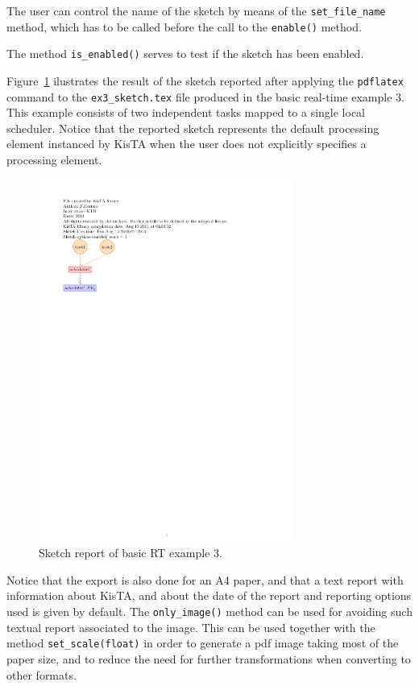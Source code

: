 The user can control the name of the sketch by means of the \texttt{set\_file\_name} method,
which has to be called before the call to the \texttt{enable()} method.

The method \texttt{is\_enabled()} serves to test if the sketch has been enabled.

Figure~\ref{fig:ex3_sketch} ilustrates the result of the sketch reported
after applying the \texttt{pdflatex} command to the \texttt{ex3\_sketch.tex} file
produced in the basic real-time example 3.
This example consists of two independent tasks mapped to a single local scheduler.
Notice that the reported sketch represents the default processing element
instanced by KisTA when the user does not explicitly specifies a processing element.
%

\begin{figure}[h]
\centering
\includegraphics[width=0.75\textwidth]{./figs/ex3_sketch.png} 
\caption{Sketch report of basic RT example 3.} 
\label{fig:ex3_sketch}
\end{figure}

Notice that the export is also done for an A4 paper, and that a text report
with information about KisTA, and about the date of the report and reporting options
used is given by default.
The \texttt{only\_image()} method can be used for avoiding such textual report
associated to the image.
%
This can be used together with the method \texttt{set\_scale(float)} in order to 
generate a pdf image taking most of the paper size, and to reduce the need
for further transformations when converting to other formats.

